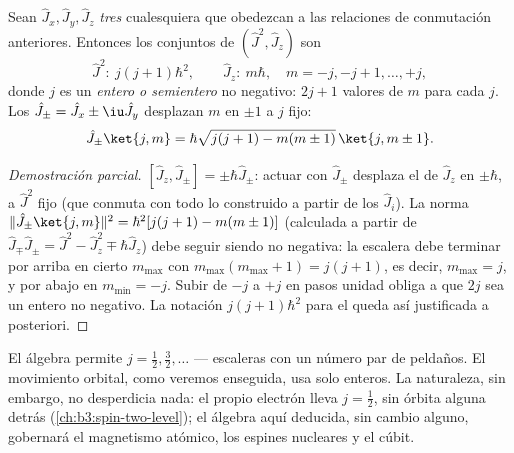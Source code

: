 \begin{theorem}\label{thm:b3:quantum-angular-momentum:spectrum}
Sean $\hat J_x, \hat J_y, \hat J_z$ \emph{tres} 
cualesquiera que obedezcan a las relaciones de conmutación anteriores.
Entonces los  conjuntos de $(\hat J^2, \hat J_z)$ son
\[
\hat J^2:\ j(j+1)\hbar^2 , \qquad
\hat J_z:\ m\hbar , \quad m = -j, -j+1, \dots, +j ,
\]
donde $j$ es un \emph{entero o semientero} no negativo: $2j + 1$
valores de $m$ para cada $j$. Los  $\hat J_\pm = \hat
J_x \pm \iu\hat J_y$ desplazan $m$ en $\pm1$ a $j$ fijo:
\[
\hat J_\pm\ket{j,m} = \hbar\sqrt{j(j+1) - m(m\pm1)}\,\ket{j,m\pm1} .
\]
\end{theorem}

\begin{proof}[Demostración parcial]
$[\hat J_z, \hat J_\pm] = \pm\hbar\hat J_\pm$: actuar con $\hat
J_\pm$ desplaza el  de $\hat J_z$ en $\pm\hbar$, a
$\hat J^2$ fijo (que conmuta con todo lo construido a partir de los $\hat
J_i$). La norma $\|\hat J_\pm\ket{j,m}\|^2 = \hbar^2[j(j+1) -
m(m\pm1)]$ (calculada a partir de $\hat J_\mp\hat J_\pm = \hat J^2 - \hat
J_z^2 \mp \hbar\hat J_z$) debe seguir siendo no negativa: la escalera debe
terminar por arriba en cierto $m_{\max}$ con $m_{\max}(m_{\max}+1) =
j(j+1)$, es decir, $m_{\max} = j$, y por abajo en $m_{\min} = -j$.
Subir de $-j$ a $+j$ en pasos unidad obliga a que $2j$ sea un entero no
negativo. La notación $j(j+1)\hbar^2$ para el  queda así
justificada a posteriori.
\end{proof}

\begin{remark}\label{rem:b3:quantum-angular-momentum:halfinteger}
El álgebra permite $j = \tfrac12, \tfrac32, \dots$ --- escaleras con un
número par de peldaños. El movimiento orbital, como veremos enseguida, usa
solo enteros. La naturaleza, sin embargo, no desperdicia nada: el propio
electrón lleva $j = \tfrac12$, sin órbita alguna detrás
(\cref{ch:b3:spin-two-level}); el álgebra aquí deducida, sin cambio alguno,
gobernará el magnetismo atómico, los espines nucleares y el cúbit.
\end{remark}


